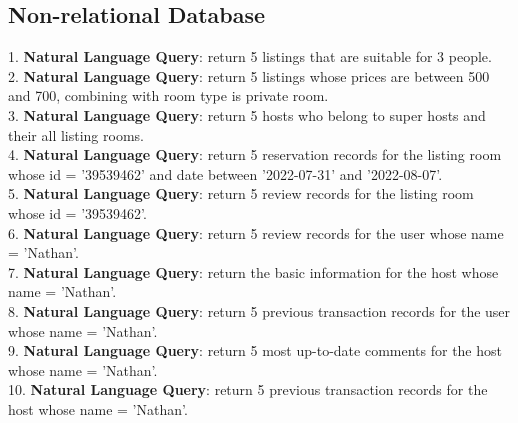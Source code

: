 \documentclass{article}
\begin{document}
	\subsection{Non-relational Database}
	1. \textbf{Natural Language Query}: return 5 listings that are suitable for 3 people.
	\vspace{3pt}
	\\
	2. \textbf{Natural Language Query}: return 5 listings whose prices are between 500 and 700, combining with room type is private room.
	\vspace{3pt}
	\\
	3. \textbf{Natural Language Query}: return 5 hosts who belong to super hosts and their all listing rooms.
	\vspace{3pt}
	\\
	4. \textbf{Natural Language Query}: return 5 reservation records for the listing room whose id = '39539462' and date between '2022-07-31' and '2022-08-07'.
	\vspace{3pt}
	\\
	5. \textbf{Natural Language Query}: return 5 review records for the listing room whose id = '39539462'.
	\vspace{3pt}
	\\
	6. \textbf{Natural Language Query}: return 5 review records for the user  whose name = 'Nathan'.
	\vspace{3pt}
	\\
	7. \textbf{Natural Language Query}: return the basic information for the host whose name = 'Nathan'.
	\vspace{3pt}
	\\
	8. \textbf{Natural Language Query}: return 5 previous transaction records for the user whose name = 'Nathan'.
	\vspace{3pt}
	\\
	9. \textbf{Natural Language Query}: return 5 most up-to-date comments for the host whose name = 'Nathan'.
	\vspace{3pt}
	\\
	10. \textbf{Natural Language Query}: return 5 previous transaction records for the host whose name = 'Nathan'.
	
\end{document}
